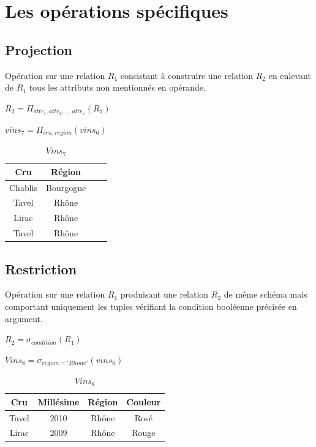 \documentclass[12pt,a4paper,openany]{book}
\begin{document}
		\section{Les opérations spécifiques}
		\subsection{Projection}
		\begin{definition}
			Opération sur une relation $R_1$ consistant à construire une relation $R_2$ en enlevant de $R_1$ tous les attributs non mentionnés en
			opérande.
		\end{definition}
		\begin{notation}
			$R_2 = \Pi_{attr_1, attr_2, \ldots, attr_n}(R_1)$
		\end{notation}
		\begin{exemple}
		\begin{table}[H]
			\centering
			$vins_7 = \Pi_{cru, region}(vins_6)$\\
			\begin{tabular}{c|c|c|c}
				\textbf{Cru} & \textbf{Région} \\
				\hline
				Chablis &Bourgogne \\
				Tavel & Rhône \\
				Lirac & Rhône \\
				Tavel & Rhône \\
			\end{tabular}
			\caption{$Vins_7$}
		\end{table}
	\end{exemple}

	\subsection{Restriction}
	\begin{definition}
	Opération sur une relation $R_1$ produisant une relation $R_2$ de même schéma mais comportant uniquement les tuples vérifiant la
	condition booléenne précisée en argument.
	\end{definition}
	\begin{notation}
		$R_2 = \sigma_{condition}(R_1)$
	\end{notation}
	\begin{exemple}
		$Vins_8 = \sigma_{region='Rhone'}(vins_6)$
		\begin{table}[H]
			\centering
			\begin{tabular}{c|c|c|c}
				\textbf{Cru} & \textbf{Millésime} & \textbf{Région} & \textbf{Couleur}\\
				\hline
				Tavel & 2010 & Rhône & Rosé\\
				Lirac & 2009 & Rhône & Rouge \\
			\end{tabular}
			\caption{$Vins_8$}
		\end{table}
	\end{exemple}
\end{document}
